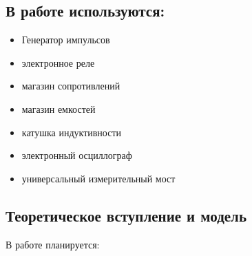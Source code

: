 \documentclass[a4paper, 12pt]{article}%
\begin{document}
\subsection{В работе используются:}
\begin{itemize}
    \item Генератор импульсов
    \item электронное реле
    \item магазин сопротивлений
    \item магазин емкостей
    \item катушка индуктивности
    \item электронный осциллограф
    \item универсальный измерительный мост 

\end{itemize}

\subsection{Теоретическое вступление и модель}

В работе планируется:
\end{document}
